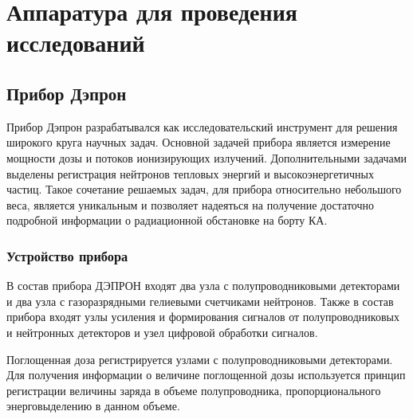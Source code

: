 \chapter{Аппаратура для проведения исследований} \label{chapt2}

\section{Прибор Дэпрон}

Прибор Дэпрон разрабатывался как исследовательский инструмент для решения широкого круга научных задач. Основной задачей прибора является измерение мощности дозы и потоков ионизирующих излучений. Дополнительными задачами выделены регистрация нейтронов тепловых энергий и высокоэнергетичных частиц. Такое сочетание решаемых задач, для прибора относительно небольшого веса,  является уникальным и позволяет надеяться на получение достаточно подробной информации о радиационной обстановке на борту КА. 

\subsection{Устройство прибора}

В состав прибора ДЭПРОН входят два узла с полупроводниковыми детекторами и два узла с газоразрядными гелиевыми счетчиками нейтронов. Также в состав прибора входят узлы усиления и формирования сигналов от полупроводниковых и нейтронных детекторов и узел цифровой обработки сигналов.


Поглощенная доза регистрируется узлами с полупроводниковыми детекторами. Для получения информации о величине поглощенной дозы используется принцип регистрации величины заряда в объеме полупроводника, пропорционального энерговыделению в данном объеме. 


